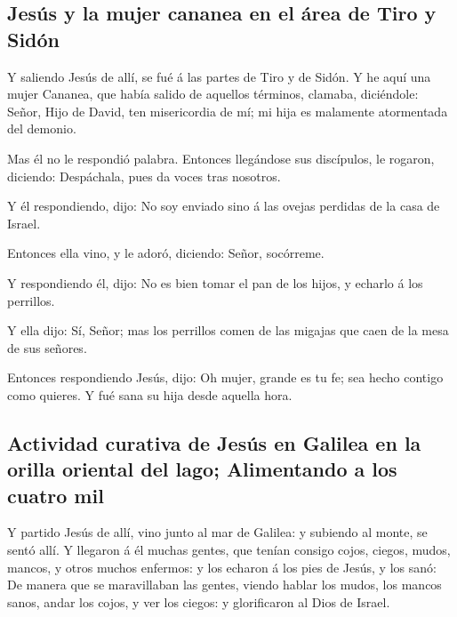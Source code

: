 \hypertarget{jesuxfas-y-la-mujer-cananea-en-el-uxe1rea-de-tiro-y-siduxf3n}{%
\subsection{Jesús y la mujer cananea en el área de Tiro y
Sidón}\label{jesuxfas-y-la-mujer-cananea-en-el-uxe1rea-de-tiro-y-siduxf3n}}

 Y saliendo Jesús de allí, se fué á las partes de Tiro y
de Sidón.  Y he aquí una mujer Cananea, que había salido
de aquellos términos, clamaba, diciéndole: Señor, Hijo de David, ten
misericordia de mí; mi hija es malamente atormentada del demonio.

 Mas él no le respondió palabra. Entonces llegándose sus
discípulos, le rogaron, diciendo: Despáchala, pues da voces tras
nosotros.

 Y él respondiendo, dijo: No soy enviado sino á las
ovejas perdidas de la casa de Israel.

 Entonces ella vino, y le adoró, diciendo: Señor,
socórreme.

 Y respondiendo él, dijo: No es bien tomar el pan de los
hijos, y echarlo á los perrillos.

 Y ella dijo: Sí, Señor; mas los perrillos comen de las
migajas que caen de la mesa de sus señores.

 Entonces respondiendo Jesús, dijo: Oh mujer, grande es
tu fe; sea hecho contigo como quieres. Y fué sana su hija desde aquella
hora.

\hypertarget{actividad-curativa-de-jesuxfas-en-galilea-en-la-orilla-oriental-del-lago-alimentando-a-los-cuatro-mil}{%
\subsection{Actividad curativa de Jesús en Galilea en la orilla oriental
del lago; Alimentando a los cuatro
mil}\label{actividad-curativa-de-jesuxfas-en-galilea-en-la-orilla-oriental-del-lago-alimentando-a-los-cuatro-mil}}

 Y partido Jesús de allí, vino junto al mar de Galilea: y
subiendo al monte, se sentó allí.  Y llegaron á él muchas
gentes, que tenían consigo cojos, ciegos, mudos, mancos, y otros muchos
enfermos: y los echaron á los pies de Jesús, y los sanó: 
De manera que se maravillaban las gentes, viendo hablar los mudos, los
mancos sanos, andar los cojos, y ver los ciegos: y glorificaron al Dios
de Israel.

